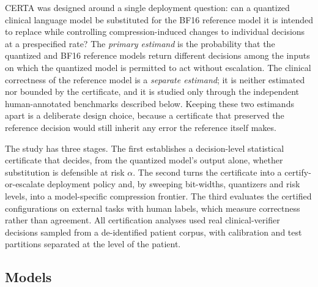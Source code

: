 \documentclass[pdflatex,sn-mathphys-num]{sn-jnl}%
\theoremstyle{thmstyleone}%
\theoremstyle{thmstyletwo}%
\theoremstyle{thmstylethree}%
\begin{document}
CERTA was designed around a single deployment question: can a quantized clinical language model
be substituted for the BF16 reference model it is intended to replace while controlling
compression-induced changes to individual decisions at a prespecified rate? The \emph{primary
estimand} is the probability that the quantized and BF16 reference models return different
decisions among the inputs on which the quantized model is permitted to act without escalation.
The clinical correctness of the reference model is a \emph{separate estimand}; it is neither
estimated nor bounded by the certificate, and it is studied only through the independent
human-annotated benchmarks described below. Keeping these two estimands apart is a deliberate
design choice, because a certificate that preserved the reference decision would still inherit any
error the reference itself makes.
 
The study has three stages. The first establishes a decision-level statistical certificate that
decides, from the quantized model's output alone, whether substitution is defensible at risk
$\alpha$. The second turns the certificate into a certify-or-escalate deployment policy and, by
sweeping bit-widths, quantizers and risk levels, into a model-specific compression frontier. The
third evaluates the certified configurations on external tasks with human labels, which measure
correctness rather than agreement. All certification analyses used real clinical-verifier
decisions sampled from a de-identified patient corpus, with calibration and test partitions
separated at the level of the patient.
 
\subsection*{Models}
 
\end{document}

